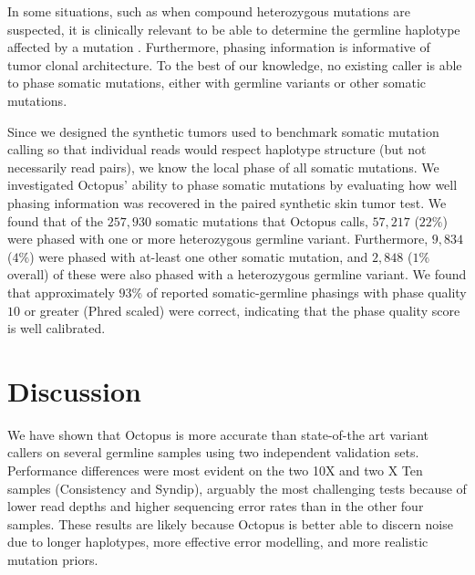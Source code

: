 \documentclass[notitlepage, twocolumn, 10pt]{article}
\begin{document}
In some situations, such as when compound heterozygous mutations are suspected, it is clinically relevant to be able to determine the germline haplotype affected by a mutation \cite{RN623}. Furthermore, phasing information is informative of tumor clonal architecture. To the best of our knowledge, no existing caller is able to phase somatic mutations, either with germline variants or other somatic mutations.

Since we designed the synthetic tumors used to benchmark somatic mutation calling so that individual reads would respect haplotype structure (but not necessarily read pairs), we know the local phase of all somatic mutations. We investigated Octopus' ability to phase somatic mutations by evaluating how well phasing information was recovered in the paired synthetic skin tumor test. We found that of the $257,930$ somatic mutations that Octopus calls, $57,217$ ($22\%$) were phased with one or more heterozygous germline variant. Furthermore, $9,834$ ($4\%$) were phased with at-least one other somatic mutation, and $2,848$ ($1\%$ overall) of these were also phased with a heterozygous germline variant. We found that approximately $93\%$ of reported somatic-germline phasings with phase quality $10$ or greater (Phred scaled) were correct, indicating that the phase quality score is well calibrated.

\section*{Discussion}

We have shown that Octopus is more accurate than state-of-the art variant callers on several germline samples using two independent validation sets. Performance differences were most evident on the two 10X and two X Ten samples (Consistency and Syndip), arguably the most challenging tests because of lower read depths and higher sequencing error rates than in the other four samples. These results are likely because Octopus is better able to discern noise due to longer haplotypes, more effective error modelling, and more realistic mutation priors.
\end{document}
